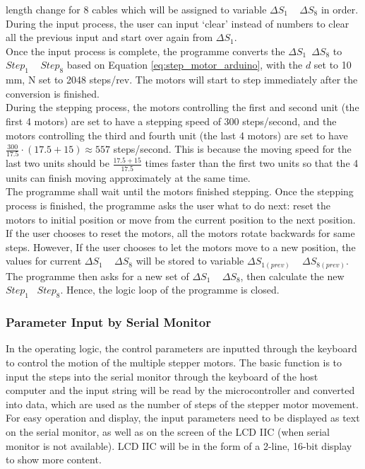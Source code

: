 \begin{itemize}
    length change for 8 cables which will be assigned to variable $\Delta S_1$ ~ $\Delta S_8$ in order. 
    During the input process, the user can input `clear' instead of numbers to clear all the previous input and 
    start over again from $\Delta S_1$. \\
    Once the input process is complete, the programme converts the $\Delta S_1$~$\Delta S_8$ to $Step_1$ ~ $Step_8$ 
    based on Equation \ref{eq:step_motor_arduino}, with the $d$ set to 10 mm, N set to 2048 steps/rev. The motors 
    will start to step immediately after the conversion is finished. \\
    During the stepping process, the motors controlling the first and second unit (the first 4 motors) are set 
    to have a stepping speed of 300 steps/second, and the motors controlling the third and fourth unit 
    (the last 4 motors) are set to have $\frac{300}{17.5}\cdot(17.5+15)\approx 557$ steps/second. This is because 
    the moving speed for the last two units should be $\frac{17.5+15}{17.5}$ times faster than the first two units 
    so that the 4 units can finish moving approximately at the same time. \\
    The programme shall wait until the motors finished stepping. Once the stepping process is finished, the programme 
    asks the user what to do next: reset the motors to initial position or move from the current position to the 
    next position. If the user chooses to reset the motors, all the motors rotate backwards for same steps. 
    However, If the user chooses to let the motors move to a new position, the values for current $\Delta S_1$ ~ 
    $\Delta S_8$ will be stored to variable $\Delta S_{1(prev)}$ ~ $\Delta S_{8(prev)}$. The programme then asks for 
    a new set of $\Delta S_1$ ~ $\Delta S_8$, then calculate the new $Step_1$ ~$Step_8$. Hence, the logic loop of the 
    programme is closed.
\end{itemize}
\subsubsection{Parameter Input by Serial Monitor}
In the operating logic, the control parameters are inputted through the keyboard to control the motion of the 
multiple stepper motors. The basic function is to input the steps into the serial monitor through the keyboard 
of the host computer and the input string will be read by the microcontroller and converted into data, which are 
used as the number of steps of the stepper motor movement. For easy operation and display, the input parameters 
need to be displayed as text on the serial monitor, as well as on the screen of the LCD IIC (when serial monitor is not available). 
LCD IIC will be in the form of a 2-line, 16-bit display to show more content. 

